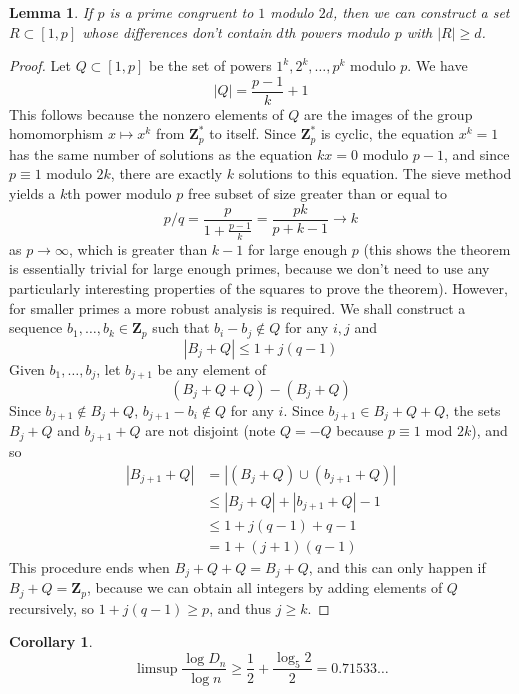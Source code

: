 \documentclass{article}
\theoremstyle{plain}
\newtheorem{lemma}{Lemma}
\newtheorem*{corollary}{Corollary}
\theoremstyle{plain}
\begin{document}
\begin{lemma}
    If $p$ is a prime congruent to $1$ modulo $2d$, then we can construct a set $R \subset [1,p]$ whose differences don't contain $d$th powers modulo $p$ with $|R| \geq d$.
\end{lemma}
\begin{proof}
    Let $Q \subset [1,p]$ be the set of powers $1^k, 2^k, \dots, p^k$ modulo $p$. We have
    \[ |Q| = \frac{p-1}{k} + 1 \]
    This follows because the nonzero elements of $Q$ are the images of the group homomorphism $x \mapsto x^k$ from $\mathbf{Z}_p^*$ to itself. Since $\mathbf{Z}_p^*$ is cyclic, the equation $x^k = 1$ has the same number of solutions as the equation $kx = 0$ modulo $p-1$, and since $p \equiv 1$ modulo $2k$, there are exactly $k$ solutions to this equation. The sieve method yields a $k$th power modulo $p$ free subset of size greater than or equal to
    \[ p/q = \frac{p}{1 + \frac{p-1}{k}} = \frac{pk}{p + k - 1} \to k \]
    as $p \to \infty$, which is greater than $k-1$ for large enough $p$ (this shows the theorem is essentially trivial for large enough primes, because we don't need to use any particularly interesting properties of the squares to prove the theorem). However, for smaller primes a more robust analysis is required. We shall construct a sequence $b_1, \dots, b_k \in \mathbf{Z}_p$ such that $b_i - b_j \not \in Q$ for any $i,j$ and
    \[ |B_j + Q| \leq 1 + j(q-1) \]
    Given $b_1, \dots, b_j$, let $b_{j+1}$ be any element of
    \[ (B_j + Q + Q) - (B_j + Q) \]
    Since $b_{j+1} \not \in B_j + Q$, $b_{j+1} - b_i \not \in Q$ for any $i$. Since $b_{j+1} \in B_j + Q + Q$, the sets $B_j + Q$ and $b_{j+1} + Q$ are not disjoint (note $Q = -Q$ because $p \equiv 1$ mod $2k$), and so
    \begin{align*}
        |B_{j+1} + Q| &= |(B_j + Q) \cup (b_{j+1} + Q)|\\
        &\leq |B_j + Q| + |b_{j+1} + Q| - 1\\
        &\leq 1 + j(q-1) + q - 1\\
        &= 1 + (j+1)(q-1)
    \end{align*}
    This procedure ends when $B_j + Q + Q = B_j + Q$, and this can only happen if $B_j + Q = \mathbf{Z}_p$, because we can obtain all integers by adding elements of $Q$ recursively, so $1 + j(q-1) \geq p$, and thus $j \geq k$.
\end{proof}

\begin{corollary}
    \[ \limsup \frac{\log D_n}{\log n} \geq \frac{1}{2} + \frac{\log_5 2}{2} = 0.71533\dots \]
\end{corollary}
\end{document}
